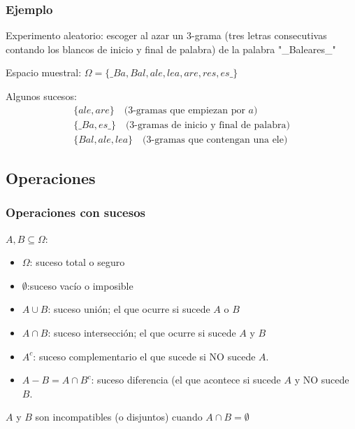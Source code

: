 \documentclass[handout]{beamer}\usepackage[]{graphicx}\usepackage[]{color}
\renewcommand{\emph}[1]{{\color{red}#1}}
\theoremstyle{plain}
\theoremstyle{definition}
\newcommand{\EM}{\Omega}
\begin{document}
\begin{frame}
\frametitle{Ejemplo}

\emph{Experimento aleatorio:} escoger al  azar un 3-grama  (tres letras consecutivas contando los blancos de inicio y final de palabra) de la palabra "\_Baleares\_" 
\medskip

\emph{Espacio muestral:} $\EM=\{\_Ba, Bal, ale, lea, are, res, es\_\}$
\medskip

\emph{Algunos sucesos:}
$$
\begin{array}{l}
\{ale,are\} \quad \mbox{(3-gramas que empiezan por  $a$)} \\[2ex]
\{\_Ba,es\_\}\quad \mbox{(3-gramas de inicio y final de palabra)}\\[2ex]
\{Bal,ale,lea\} \quad \mbox{(3-gramas que contengan una ele)}
\end{array}
$$

\end{frame}


\subsection{Operaciones}
\begin{frame}
\frametitle{Operaciones con sucesos}

$A,B\subseteq \EM$:

\begin{itemize}
\item $\EM$: suceso \emph{total} o \emph{seguro}
\item $\emptyset$:suceso  \emph{vacío} o \emph{imposible}
\item $A\cup B$: suceso \emph{unión}; el que ocurre si sucede $A$ o $B$
\item $A\cap B$: suceso \emph{intersección}; el que ocurre si sucede $A$ y $B$
\item $A^c$: suceso \emph{complementario}  el que sucede si NO sucede $A$.
\item $A- B=A\cap B^c$: suceso \emph{diferencia} (el que acontece  si sucede $A$ y NO sucede $B$.
\end{itemize}

$A$ y $B$ son \emph{incompatibles} (o \emph{disjuntos}) cuando  $A\cap B=\emptyset$

\end{frame}
\end{document}
